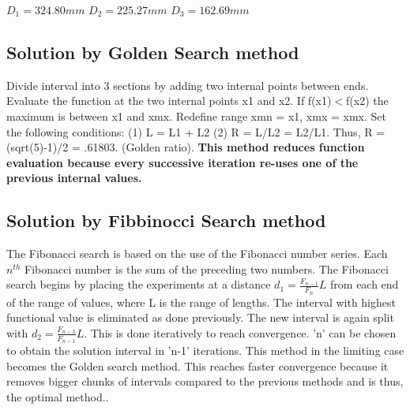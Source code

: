 \documentclass[10pt,a4paper]{article}
\begin{document}
  \begin{center}
$D_1=324.80mm$  
 \newline  $D_2=225.27mm$  
 \newline   $D_3=162.69mm$  \newline
 \end{center}
  \subsection{Solution by Golden Search method}
  
  Divide interval into 3 sections by adding two internal points between ends. Evaluate the function at the two internal points x1 and x2. If f(x1)$ < $f(x2)
the maximum is between x1 and xmx. Redefine range xmn = x1, xmx = xmx. Set the following conditions:
(1) L = L1 + L2
(2) R = L/L2 = L2/L1.  Thus, R = (sqrt(5)-1)/2 = .61803. (Golden ratio). \textbf{This method reduces function evaluation because every successive iteration re-uses one of the previous internal values.}

 
 
  \subsection{Solution by Fibbinocci Search method}
  
 The Fibonacci search is based on the use of the Fibonacci number series. Each $n^{th}$  Fibonacci number is the sum of the preceding two numbers. The Fibonacci search begins by placing the experiments at a distance $d_1=\frac{F_{n-1}}{F_n}L$ from each end of the range of values, where L is the range of lengths. The interval with highest functional value is eliminated as done previously. The new interval is again split with  $d_2=\frac{F_{n-3}}{F_{n-1}}L$. This is done iteratively to reach convergence. 'n' can be chosen to obtain the solution interval in 'n-1' iterations. This method in the limiting case becomes the Golden search method. This reaches faster convergence because it removes bigger chunks of intervals compared to the previous methods and is thus, the optimal method.. 
\end{document}
